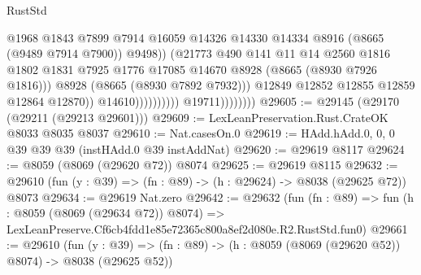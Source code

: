 \begin{lexlean}{RustStd}
\begin{coremodule}
                                                  @1968
                                                  @1843
                                                  @7899
                                                  @7914
                                                  @16059
                                                  @14326
                                                  @14330
                                                  @14334
                                                  @8916
                                                  (@8665 (@9489 @7914 @7900))
                                                  @9498))
                                              (@21773
                                                @490
                                                @141
                                                @11
                                                @14
                                                @2560
                                                @1816
                                                @1802
                                                @1831
                                                @7925
                                                @1776
                                                @17085
                                                @14670
                                                @8928
                                                (@8665 (@8930 @7926 @1816)))
                                              @8928
                                              (@8665 (@8930 @7892 @7932)))
                                            @12849
                                            @12852
                                            @12855
                                            @12859
                                            @12864
                                            @12870))
                                        @14610))))))))))
                    @19711))))))))
@29605 := @29145 (@29170 (@29211 (@29213 @29601)))
@29609 := LexLeanPreservation.Rust.CrateOK @8033 @8035 @8037
@29610 := Nat.casesOn.{0}
@29619 := HAdd.hAdd.{0, 0, 0} @39 @39 @39 (instHAdd.{0} @39 instAddNat)
@29620 := @29619 @8117
@29624 := @8059 (@8069 (@29620 @72)) @8074
@29625 := @29619 @8115
@29632 := @29610 (fun (y : @39) => (fn : @89) -> (h : @29624) -> @8038 (@29625 @72)) @8073
@29634 := @29619 Nat.zero
@29642 := @29632
    (fun (fn : @89) =>
    fun (h : @8059 (@8069 (@29634 @72)) @8074) =>
    LexLeanPreserve.Cf6cb4fdd1e85e72365c800a8ef2d080e.R2.RustStd.fun0)
@29661 := @29610
    (fun (y : @39) => (fn : @89) -> (h : @8059 (@8069 (@29620 @52)) @8074) -> @8038 (@29625 @52))

\end{coremodule}
\end{lexlean}

